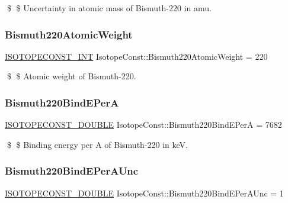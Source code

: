 \$ \$ Uncertainty in atomic mass of Bismuth-\/220 in amu. \mbox{\label{group___isotope_const-_bismuth-_bi220_ga4e3bae29bf3714aa455ced512d1f35c7}} 
\subsubsection{\texorpdfstring{Bismuth220\+Atomic\+Weight}{Bismuth220AtomicWeight}}
{\footnotesize\ttfamily \mbox{\hyperlink{group___isotope_const-_macros_ga5f18360b3e99483a35c32d789e62621c}{I\+S\+O\+T\+O\+P\+E\+C\+O\+N\+S\+T\+\_\+\+I\+NT}} Isotope\+Const\+::\+Bismuth220\+Atomic\+Weight = 220}

\$ \$ Atomic weight of Bismuth-\/220. \mbox{\label{group___isotope_const-_bismuth-_bi220_ga04511ebdc4595301bd1bb63f830dd49a}} 
\subsubsection{\texorpdfstring{Bismuth220\+Bind\+E\+PerA}{Bismuth220BindEPerA}}
{\footnotesize\ttfamily \mbox{\hyperlink{group___isotope_const-_macros_ga8f45a7272ce02c0b4c65c44636ed719a}{I\+S\+O\+T\+O\+P\+E\+C\+O\+N\+S\+T\+\_\+\+D\+O\+U\+B\+LE}} Isotope\+Const\+::\+Bismuth220\+Bind\+E\+PerA = 7682}

\$ \$ Binding energy per A of Bismuth-\/220 in keV. \mbox{\label{group___isotope_const-_bismuth-_bi220_ga059cae2073f31890934c8bf4647d1900}} 
\subsubsection{\texorpdfstring{Bismuth220\+Bind\+E\+Per\+A\+Unc}{Bismuth220BindEPerAUnc}}
{\footnotesize\ttfamily \mbox{\hyperlink{group___isotope_const-_macros_ga8f45a7272ce02c0b4c65c44636ed719a}{I\+S\+O\+T\+O\+P\+E\+C\+O\+N\+S\+T\+\_\+\+D\+O\+U\+B\+LE}} Isotope\+Const\+::\+Bismuth220\+Bind\+E\+Per\+A\+Unc = 1}

